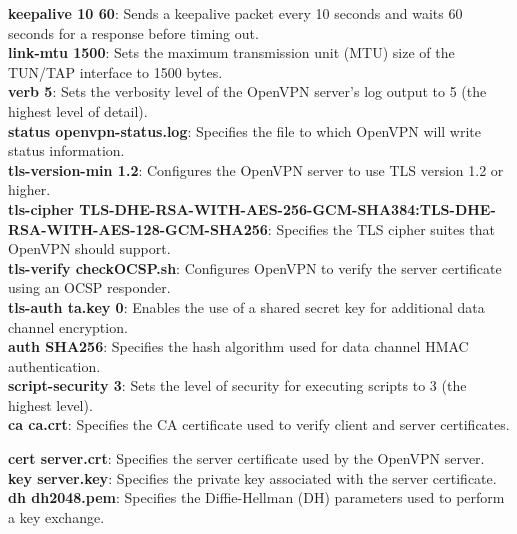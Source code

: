 \documentclass[12pt]{article}
\begin{document}
\textbf{keepalive 10 60}: Sends a keepalive packet every 10 seconds and waits 60 seconds for a response before timing out.\\

\textbf{link-mtu 1500}: Sets the maximum transmission unit (MTU) size of the TUN/TAP interface to 1500 bytes.\\

\textbf{verb 5}: Sets the verbosity level of the OpenVPN server's log output to 5 (the highest level of detail).\\

\textbf{status openvpn-status.log}: Specifies the file to which OpenVPN will write status information.\\

\textbf{tls-version-min 1.2}: Configures the OpenVPN server to use TLS version 1.2 or higher.\\

\textbf{tls-cipher TLS-DHE-RSA-WITH-AES-256-GCM-SHA384:TLS-DHE-RSA-WITH-AES-128-GCM-SHA256}: Specifies the TLS cipher suites that OpenVPN should support.\\

\textbf{tls-verify checkOCSP.sh}: Configures OpenVPN to verify the server certificate using an OCSP responder.\\

\textbf{tls-auth ta.key 0}: Enables the use of a shared secret key for additional data channel encryption.\\

\textbf{auth SHA256}: Specifies the hash algorithm used for data channel HMAC authentication.\\

\textbf{script-security 3}: Sets the level of security for executing scripts to 3 (the highest level).\\

\textbf{ca ca.crt}: Specifies the CA certificate used to verify client and server certificates.\\

\newpage

\textbf{cert server.crt}: Specifies the server certificate used by the OpenVPN server.\\

\textbf{key server.key}: Specifies the private key associated with the server certificate.\\

\textbf{dh dh2048.pem}: Specifies the Diffie-Hellman (DH) parameters used to perform a key exchange.\\
\end{document}
